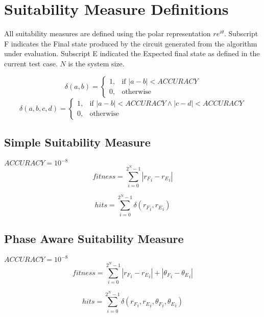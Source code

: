 \chapter{Suitability Measure Definitions}
\label{sec:suitmeasdefs}
All suitability measures are defined using the polar representation $re^{i\theta}$.
Subscript F indicates the Final state produced by the circuit generated from the algorithm under evaluation.
Subscript E indicated the Expected final state as defined in the current test case.
$N$ is the system size.

\begin{equation}
 \delta(a,b)=
\left\{
  \begin{array}{cc} 1, & \mbox{if } |a-b|<ACCURACY\\ 
  0, & \mbox{otherwise}\end{array}
\right.
\end{equation}
\begin{equation}
 \delta(a,b,c,d)=
\left\{
  \begin{array}{cc} 1, & \mbox{if } |a-b|<ACCURACY\wedge|c-d|<ACCURACY\\ 
  0, & \mbox{otherwise}\end{array}
\right.
\end{equation}


\section{Simple Suitability Measure}
$ACCURACY=10^{-8}$
\begin{equation}
 fitness=\sum_{i=0}^{2^N-1}|{r_F}_i-{r_E}_i|
\end{equation}

\begin{equation}
 hits=\sum_{i=0}^{2^N-1}\delta({r_F}_i,{r_E}_i)
\end{equation}


\section{Phase Aware Suitability Measure}
$ACCURACY=10^{-8}$
\begin{equation}
 fitness=\sum_{i=0}^{2^N-1}|{r_F}_i-{r_E}_i|+|{\theta_F}_i-{\theta_E}_i|
\end{equation}

\begin{equation}
 hits=\sum_{i=0}^{2^N-1}\delta({r_F}_i,{r_E}_i,{\theta_F}_i,{\theta_E}_i)
\end{equation}
